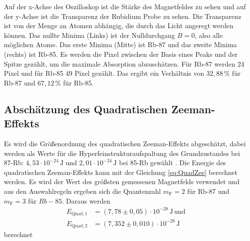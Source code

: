 Auf der x-Achse des Oszilloskop ist die Stärke des Magnetfeldes zu sehen und auf der y-Achse ist die Transparenz der Rubidium Probe zu sehen.
Die Transparenz ist von der Menge an Atomen abhängig, die durch das Licht angeregt werden können.
Das nullte Minima (Links) ist der Nulldurchgang $B = 0$, also alle möglichen Atome.
Das erste Minima (Mitte) ist Rb-87 und das zweite Minima (rechts) ist Rb-85.
Es werden die Pixel zwischen der Basis eines Peaks und der Spitze gezählt, um die maximale Absorption abzuschätzen.
Für Rb-87 werden 24 Pixel und für Rb-85 49 Pixel gezählt.
Das ergibt ein Verhältnis von $32,88\, \%$ für Rb-87 und $67,12 \, \% $ für Rb-85.

\subsection{Abschätzung des Quadratischen Zeeman-Effekts}

Es wird die Größenordnung des quadratischen Zeeman-Effekts abgeschätzt, 
dabei werden als Werte für die Hyperfeinstrukturaufspaltung des Grundzustandes bei 87-Rb: $4,53 \cdot 10^{-24} \, \unit{\joule} $ und $2,01 \cdot 10^{-24} \, \unit{\joule}$ bei  85-Rb  gewählt \cite{v21}.
Die Energie des quadratischen Zeeman-Effekts kann mit der Gleichung \eqref{eq:QuadZee} berechnet werden.
Es wird der Wert des größsten gemessenen Magnetfelds verwendet und aus den Auswahlregeln ergeben sich die Quantenzahl $m_\text{F} = 2$ für Rb-87 und $m_\text{F} = 3$ für $Rb-85$.
Daraus werden 
\begin{align*}
    E_{\text{Quad},1} &= \left(7,78  \pm 0,05 \right)   \cdot 10^{-28} \, \unit{\joule} \, \text{und} \\
    E_{\text{Quad},2} &= \left(7,352 \pm 0,010 \right) \cdot 10^{-28} \, \unit{\joule}
\end{align*}
berechnet
